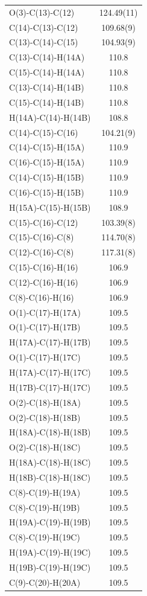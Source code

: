 \begin{center}
{\begin{supertabular}{p{1.5in}c}
O(3)-C(13)-C(12)&124.49(11)\\
C(14)-C(13)-C(12)&109.68(9)\\
C(13)-C(14)-C(15)&104.93(9)\\
C(13)-C(14)-H(14A)&110.8\\
C(15)-C(14)-H(14A)&110.8\\
C(13)-C(14)-H(14B)&110.8\\
C(15)-C(14)-H(14B)&110.8\\
H(14A)-C(14)-H(14B)&108.8\\
C(14)-C(15)-C(16)&104.21(9)\\
C(14)-C(15)-H(15A)&110.9\\
C(16)-C(15)-H(15A)&110.9\\
C(14)-C(15)-H(15B)&110.9\\
C(16)-C(15)-H(15B)&110.9\\
H(15A)-C(15)-H(15B)&108.9\\
C(15)-C(16)-C(12)&103.39(8)\\
C(15)-C(16)-C(8)&114.70(8)\\
C(12)-C(16)-C(8)&117.31(8)\\
C(15)-C(16)-H(16)&106.9\\
C(12)-C(16)-H(16)&106.9\\
C(8)-C(16)-H(16)&106.9\\
O(1)-C(17)-H(17A)&109.5\\
O(1)-C(17)-H(17B)&109.5\\
H(17A)-C(17)-H(17B)&109.5\\
O(1)-C(17)-H(17C)&109.5\\
H(17A)-C(17)-H(17C)&109.5\\
H(17B)-C(17)-H(17C)&109.5\\
O(2)-C(18)-H(18A)&109.5\\
O(2)-C(18)-H(18B)&109.5\\
H(18A)-C(18)-H(18B)&109.5\\
O(2)-C(18)-H(18C)&109.5\\
H(18A)-C(18)-H(18C)&109.5\\
H(18B)-C(18)-H(18C)&109.5\\
C(8)-C(19)-H(19A)&109.5\\
C(8)-C(19)-H(19B)&109.5\\
H(19A)-C(19)-H(19B)&109.5\\
C(8)-C(19)-H(19C)&109.5\\
H(19A)-C(19)-H(19C)&109.5\\
H(19B)-C(19)-H(19C)&109.5\\
C(9)-C(20)-H(20A)&109.5\\

\end{supertabular}}
\end{center}

